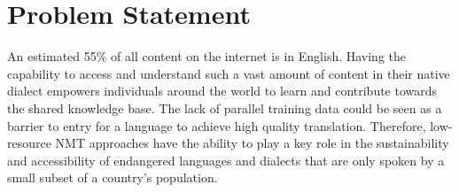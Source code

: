 %
%
%
%
%


\section{Problem Statement}
An estimated 55\% of all content on the internet is in English. Having the capability to access and understand such a vast amount of content in their native dialect empowers individuals around the world to learn and contribute towards the shared knowledge base. The lack of parallel training data could be seen as a barrier to entry for a language to achieve high quality translation. Therefore, low-resource \acrshort{NMT} approaches have the ability to play a key role in the sustainability and accessibility of endangered languages and dialects that are only spoken by a small subset of a country's population. 

